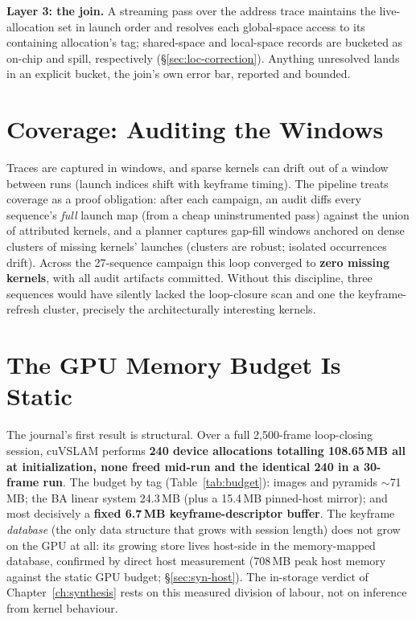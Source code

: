 \textbf{Layer 3: the join.} A streaming pass over the address trace maintains the live-allocation set in launch order and resolves each global-space access to its containing allocation’s tag; shared-space and local-space records are bucketed as on-chip and spill, respectively (\S\ref{sec:loc-correction}). Anything unresolved lands in an explicit  bucket, the join’s own error bar, reported and bounded.

\section{Coverage: Auditing the Windows}
\label{sec:attr-coverage}

Traces are captured in windows, and sparse kernels can drift out of a window between runs (launch indices shift with keyframe timing). The pipeline treats coverage as a proof obligation: after each campaign, an audit diffs every sequence’s \emph{full} launch map (from a cheap uninstrumented pass) against the union of attributed kernels, and a planner captures gap-fill windows anchored on dense clusters of missing kernels’ launches (clusters are robust; isolated occurrences drift). Across the 27-sequence campaign this loop converged to \textbf{zero missing kernels}, with all audit artifacts committed. Without this discipline, three sequences would have silently lacked the loop-closure scan and one the keyframe-refresh cluster, precisely the architecturally interesting kernels.

\section{The GPU Memory Budget Is Static}
\label{sec:attr-static}

The journal’s first result is structural. Over a full 2{,}500-frame loop-closing session, cuVSLAM performs \textbf{240 device allocations totalling 108.65\,MB all at initialization, none freed mid-run and the identical 240 in a 30-frame run}. The budget by tag (Table~\ref{tab:budget}): images and pyramids $\sim$71\,MB; the BA linear system 24.3\,MB (plus a 15.4\,MB pinned-host mirror); and most decisively a \textbf{fixed 6.7\,MB keyframe-descriptor buffer}. The keyframe \emph{database} (the only data structure that grows with session length) does not grow on the GPU at all: its growing store lives host-side in the memory-mapped database, confirmed by direct host measurement (708\,MB peak host memory against the static GPU budget; \S\ref{sec:syn-host}). The in-storage verdict of Chapter~\ref{ch:synthesis} rests on this measured division of labour, not on inference from kernel behaviour.

